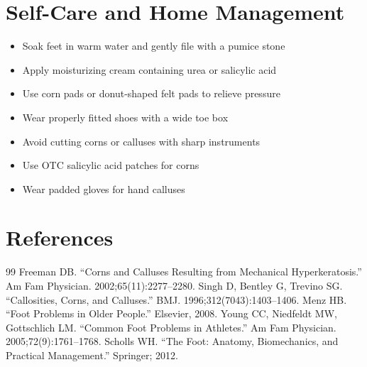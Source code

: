 \section*{Self-Care and Home Management}
\begin{itemize}
\item Soak feet in warm water and gently file with a pumice stone
\item Apply moisturizing cream containing urea or salicylic acid
\item Use corn pads or donut-shaped felt pads to relieve pressure
\item Wear properly fitted shoes with a wide toe box
\item Avoid cutting corns or calluses with sharp instruments
\item Use OTC salicylic acid patches for corns
\item Wear padded gloves for hand calluses
\end{itemize}

\section*{References}
\begin{thebibliography}{99}
 Freeman DB. ``Corns and Calluses Resulting from Mechanical Hyperkeratosis.'' Am Fam Physician. 2002;65(11):2277--2280.
 Singh D, Bentley G, Trevino SG. ``Callosities, Corns, and Calluses.'' BMJ. 1996;312(7043):1403--1406.
 Menz HB. ``Foot Problems in Older People.'' Elsevier, 2008.
 Young CC, Niedfeldt MW, Gottschlich LM. ``Common Foot Problems in Athletes.'' Am Fam Physician. 2005;72(9):1761--1768.
 Scholls WH. ``The Foot: Anatomy, Biomechanics, and Practical Management.'' Springer; 2012.
\end{thebibliography}
